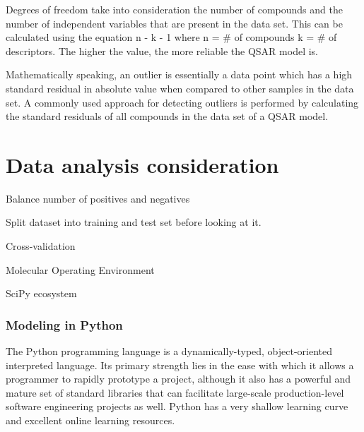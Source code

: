 
Degrees of freedom take into consideration the number of compounds and the number of independent variables that are present in the data set. This can be calculated using the equation n - k - 1 where n = \# of compounds k = \# of descriptors. The higher the value, the more reliable the QSAR model is. \cite{Nantasenamat2009}

Mathematically speaking, an outlier is essentially a data point which has a high standard residual in absolute value when compared to other samples in the data set. A commonly used approach for detecting outliers is performed by calculating the standard residuals of all compounds in the data set of a QSAR model. \cite{Nantasenamat2009}



\section{Data analysis consideration}
\begin{description}
\item Balance number of positives and negatives

\item Split dataset into training and test set before looking at it.

\item Cross-validation
\end{description}

\begin{description}
\item Molecular Operating Environment
\item SciPy ecosystem

\end{description}


\subsubsection{Modeling in Python}
The Python programming language is a dynamically-typed, object-oriented interpreted language. Its primary strength lies in the ease with which it allows a programmer to rapidly prototype a project, although it also has a powerful and mature set of standard libraries that can facilitate large-scale production-level software engineering projects as well. Python has a very shallow learning curve and excellent online learning resources.



